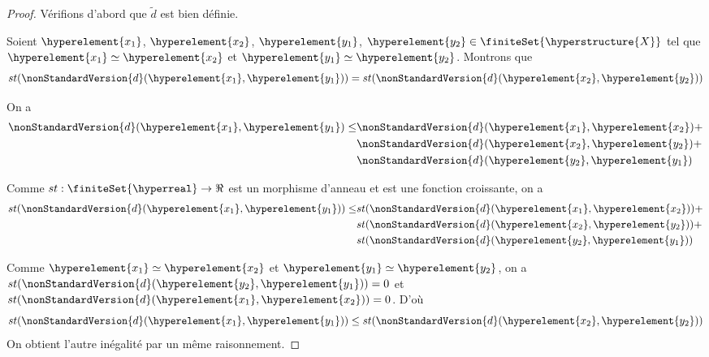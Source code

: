 \ifdefined\outputproof
\begin{proof}
	Vérifions d'abord que $\tilde{d}$ est bien définie.

	Soient $\hyperelement{x_{1}}$, $\hyperelement{x_{2}}$,
	$\hyperelement{y_{1}}$, $\hyperelement{y_{2}} \in
	\finiteSet{\hyperstructure{X}}$ tel que $\hyperelement{x_{1}} \simeq
	\hyperelement{x_{2}}$ et $\hyperelement{y_{1}} \simeq \hyperelement{y_{2}}$.
	Montrons que
	\begin{equation}
		st(\nonStandardVersion{d}(\hyperelement{x_{1}}, \hyperelement{y_{1}})) =
	st(\nonStandardVersion{d}(\hyperelement{x_{2}}, \hyperelement{y_{2}}))
	\end{equation}

	On a
	\begin{align}
		\nonStandardVersion{d}(\hyperelement{x_{1}}, \hyperelement{y_{1}})
		\leq & \nonStandardVersion{d}(\hyperelement{x_{1}},
		\hyperelement{x_{2}}) +
		\\
		& \nonStandardVersion{d}(\hyperelement{x_{2}}, \hyperelement{y_{2}}) +
		\\
		& \nonStandardVersion{d}(\hyperelement{y_{2}}, \hyperelement{y_{1}})
	\end{align}

	Comme $st : \finiteSet{\hyperreal} \rightarrow \real$ est un morphisme
	d'anneau et est une fonction croissante, on a
	\begin{align}
		st(\nonStandardVersion{d}(\hyperelement{x_{1}}, \hyperelement{y_{1}}))
		\leq & st(\nonStandardVersion{d}(\hyperelement{x_{1}},
		\hyperelement{x_{2}})) +
		\\
		& st(\nonStandardVersion{d}(\hyperelement{x_{2}}, \hyperelement{y_{2}})) +
		\\
		& st(\nonStandardVersion{d}(\hyperelement{y_{2}}, \hyperelement{y_{1}}))
	\end{align}

	Comme $\hyperelement{x_{1}} \simeq
	\hyperelement{x_{2}}$ et $\hyperelement{y_{1}} \simeq \hyperelement{y_{2}}$,
	on a $st(\nonStandardVersion{d}(\hyperelement{y_{2}}, \hyperelement{y_{1}}))
	= 0$ et \\ $st(\nonStandardVersion{d}(\hyperelement{x_{1}},
	\hyperelement{x_{2}})) = 0$.
	D'où
	\begin{equation}
		st(\nonStandardVersion{d}(\hyperelement{x_{1}}, \hyperelement{y_{1}})) \leq
	st(\nonStandardVersion{d}(\hyperelement{x_{2}}, \hyperelement{y_{2}}))
	\end{equation}
	On obtient l'autre inégalité par un même raisonnement.


\end{proof}
